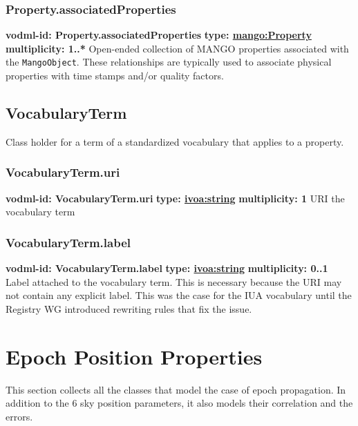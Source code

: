     \subsubsection{Property.associatedProperties}
    \textbf{vodml-id: Property.associatedProperties} \newline
    \textbf{type: \hyperref[sect:Property]{mango:Property}} \newline
    \textbf{multiplicity: 1..*} \newline
    Open-ended collection of MANGO properties associated with the \texttt{MangoObject}. These relationships are typically used to associate physical properties with time stamps and/or quality factors.

  \subsection{VocabularyTerm}
    \label{sect:VocabularyTerm}
    Class holder for a term of a standardized vocabulary that applies to a property.

    \subsubsection{VocabularyTerm.uri}
    \textbf{vodml-id: VocabularyTerm.uri} \newline
    \textbf{type: \hyperref[sect:ivoa]{ivoa:string}} \newline
    \textbf{multiplicity: 1} \newline
    URI the vocabulary term

    \subsubsection{VocabularyTerm.label}
    \textbf{vodml-id: VocabularyTerm.label} \newline
    \textbf{type: \hyperref[sect:ivoa]{ivoa:string}} \newline
    \textbf{multiplicity: 0..1} \newline
    Label attached to the vocabulary term. This is necessary because the URI may not contain any explicit label. This was the case for the IUA vocabulary until the Registry WG introduced rewriting rules that fix the issue.

\section{Epoch Position Properties}
This section collects all the classes that model the case of epoch propagation. 
In addition to the 6 sky position parameters, it also models their correlation and the errors.
